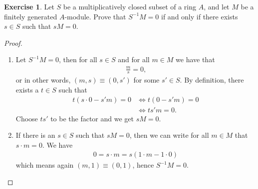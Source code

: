 \documentclass{book}
\theoremstyle{plain}
\theoremstyle{definition}
\newtheorem{exr}[thm]{Exercise}
\theoremstyle{custom_definition}
\begin{document}
\begin{exr}
    Let \(S\) be a multiplicatively closed subset of a ring \(A\), and let \(M\) be a finitely generated \(A\)-module. Prove that \(S^{-1}M = 0\) if and only if there exists \(s \in S\) such that \(sM = 0\).
\end{exr}
\begin{proof}
    \begin{enumerate}
        \item Let \(S^{-1}M = 0\), then for all \(s \in S\) and for all \(m \in M\) we have that
        \begin{align}
            \frac{m}{s} = 0 \text{,}
        \end{align}
        or in other words, \((m, s) \equiv (0, s')\) for some \(s' \in S\).
        By definition, there exists a \(t \in S\) such that
        \begin{align}
            t(s\cdot 0 - s'm) = 0 &\iff t(0 - s'm) = 0 \\
            &\iff t s' m = 0 \text{.}
        \end{align}
        Choose \(t s'\) to be the factor and we get \(sM = 0\).
        \item If there is an \(s \in S\) such that \(sM = 0\), then we can write for all \(m \in M\) that \(s \cdot m = 0\). We have
        \begin{align}
            0 = s \cdot m = s (1 \cdot m - 1 \cdot 0)
        \end{align}
        which means again \((m, 1) \equiv (0, 1)\), hence \(S^{-1}M = 0\).
    \end{enumerate}
\end{proof}
\end{document}
